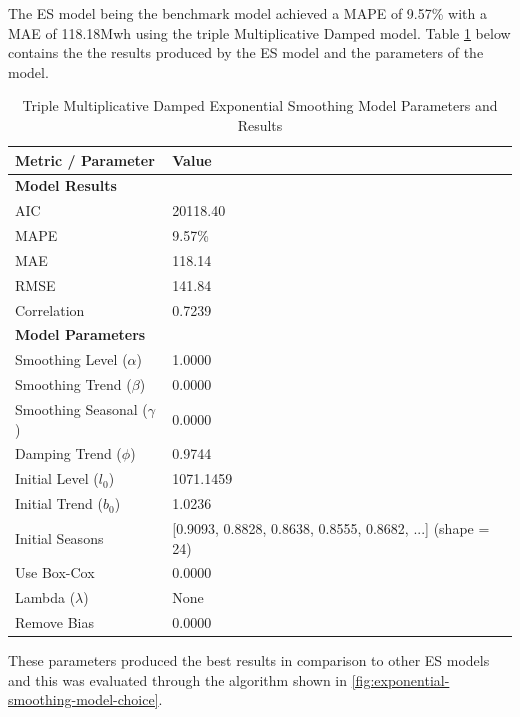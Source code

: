 The ES model being the benchmark model achieved a MAPE of 9.57\% with a MAE of 118.18Mwh using the triple Multiplicative Damped model. Table \ref{tab:exp_smoothing_results} below contains the the results produced by the ES model and the parameters of the model. 
\begin{table}[h]
	\centering
	\caption{Triple Multiplicative Damped Exponential Smoothing Model Parameters and Results}
	\label{tab:exp_smoothing_results}
	\begin{tabular}{ll}
		\hline
		\textbf{Metric / Parameter} & \textbf{Value} \\
		\hline
		\multicolumn{2}{l}{\textbf{Model Results}} \\
		AIC & 20118.40 \\
		MAPE &  9.57\% \\
		MAE & 118.14 \\
		RMSE & 141.84 \\
		Correlation & 0.7239\\
		\hline
		\multicolumn{2}{l}{\textbf{Model Parameters}} \\
		Smoothing Level ($\alpha$) & 1.0000 \\
		Smoothing Trend ($\beta$) & 0.0000 \\
		Smoothing Seasonal ($\gamma$) & 0.0000 \\
		Damping Trend ($\phi$) & 0.9744 \\
		Initial Level ($l_0$) & 1071.1459 \\
		Initial Trend ($b_0$) & 1.0236 \\
		Initial Seasons & [0.9093, 0.8828, 0.8638, 0.8555, 0.8682, ...] (shape = 24) \\
		Use Box-Cox & 0.0000 \\
		Lambda ($\lambda$) & None \\
		Remove Bias & 0.0000 \\
		\hline
	\end{tabular}
	
\end{table}
These parameters produced the best results in comparison to other ES models and this was evaluated through the algorithm shown in  \ref{fig:exponential-smoothing-model-choice}. 
